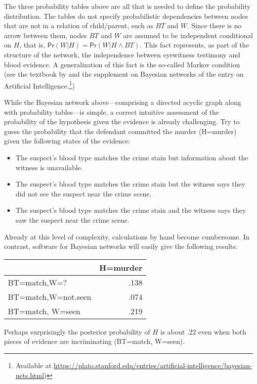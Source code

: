 \documentclass{article}
\newcommand{\pr}{\mathsf{Pr}}
\begin{document}
The three probability tables above are all that is needed to define the probability distribution. The tables do not specify probabilistic dependencies between nodes that are not in a relation of child/parent, such as $BT$ and $W$. Since there is no arrow between them, nodes $BT$ and $W$ are assumed to be independent conditional on $H$, that is, $\pr(W \vert H)=\pr(W \vert H \wedge BT)$. This fact represents, as part of the structure of the network, the independence between eyewitness testimony and  blood evidence. A generalization of this fact
is the so-called Markov condition (see the textbook by \cite{neapolitan2004learning} and the supplement on Bayesian networks of the entry on Artificial Intelligence.\footnote{Available at \url{https://plato.stanford.edu/entries/artificial-intelligence/bayesian-nets.html})})

While the Bayesian network above---comprising a directed acyclic graph along with probability tables---is simple, a correct intuitive assessment of
the probability of the hypothesis given the
evidence is already challenging. Try to guess the probability that the defendant committed the murder (H=murder) given 
the following states of the
evidence:

\begin{itemize} 
\item The suspect's blood type matches the crime stain but  information about the witness is unavailable.
\item The suspect's blood type matches the crime stain but the witness says they did not see the suspect near the crime scene.
\item The suspect's blood type matches the crime stain and the witness says they saw the suspect near the crime scene.
\end{itemize}


\noindent Already at this level of complexity, calculations by hand become cumbersome. In contrast,  software for Bayesian networks \citep[see, for example, the $\textbf{\textsf{R}}$
package  $\textbf{\textsf{bnlearn}}$ developed by Marco Scutari and described in][]{Scutari2015Bayesian-Networ}
will easily give the following results: 
\begin{table}[H]
\centering
\begin{tabular}{lr}
\toprule
  & H=murder\\
\midrule
BT=match,W=? & .138\\
BT=match,W=not.seen & .074\\
BT=match, W=seen & .219\\
\bottomrule
\end{tabular}
\end{table}
\noindent
Perhaps surprisingly the posterior probability of $H$ is about .22 even when both pieces of evidence are incriminating (BT=match, W=seen).
\end{document}
